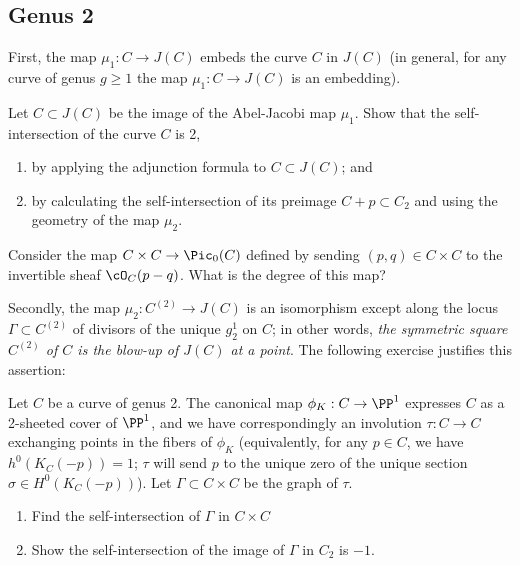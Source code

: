 \subsection{Genus 2}

First, the map $\mu_1 : C \to J(C)$ embeds the curve $C$ in $J(C)$ (in general, for any curve of genus $g \geq 1$ the map $\mu_1 : C \to J(C)$ is an embedding). 

\begin{exercise}
Let $C \subset J(C)$ be the image of the Abel-Jacobi map $\mu_1$. Show that the self-intersection of the curve $C$ is 2,
\begin{enumerate}
\item by applying the adjunction formula to $C \subset J(C)$; and
\item by calculating the self-intersection of its preimage $C + p \subset C_2$ and using the geometry of the map $\mu_2$.
\end{enumerate}
\end{exercise}

\begin{exercise}
Consider the map $C \times C \to \Pic_0(C)$ defined by sending $(p, q)\in C \times C$ to the invertible sheaf $\cO_C(p-q)$. What is the degree of this map?
\end{exercise}

Secondly, the map $\mu_2 : C^{(2)} \to J(C)$ is an isomorphism except along the locus $\Gamma \subset  C^{(2)} $ of divisors of the unique $g^1_2$ on $C$; in other words, \emph{the symmetric square $ C^{(2)} $ of $C$ is the blow-up of $J(C)$ at a point}. The following exercise justifies this assertion:

\begin{exercise}
Let $C$ be a curve of genus 2. The canonical map $\phi_K : C \to \PP^1$ expresses $C$ as a 2-sheeted cover of $\PP^1$, and we have correspondingly an involution $\tau : C \to C$ exchanging points in the fibers of $\phi_K$ (equivalently, for any $p \in C$, we have $h^0(K_C(-p)) = 1$; $\tau$ will send $p$ to the unique zero of the unique section $\sigma \in H^0(K_C(-p))$). Let $\Gamma \subset C \times C$ be the graph of $\tau$.
\begin{enumerate}
\item Find the self-intersection of $\Gamma$ in $C \times C$
\item Show the self-intersection of the image of $\Gamma$ in $C_2$ is $-1$.
\end{enumerate}
\end{exercise}


